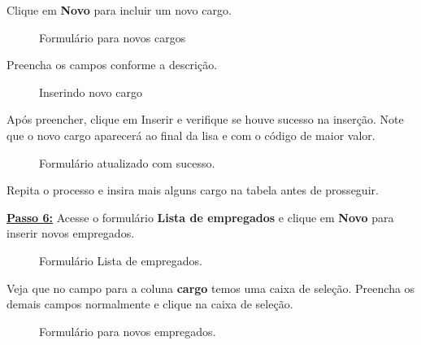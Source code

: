 \documentclass[9pt]{report}
\begin{document}
{       Clique em \textbf{Novo} para incluir um novo cargo.
       
       \begin{figure}[H]
        \caption{Formulário para novos cargos}
        \label{fig:novoscargos}
       \end{figure}

       Preencha os campos conforme a descrição.

       \begin{figure}[H]
        \caption{Inserindo novo cargo}
        \label{fig:novocargo}
       \end{figure}

       Após preencher, clique em Inserir e verifique se houve sucesso
       na inserção. Note que o novo cargo aparecerá ao final da lisa
       e com o código de maior valor.

       \begin{figure}[H]
        \caption{Formulário atualizado com sucesso.}
        \label{fig:cargoinserido}
       \end{figure}

       Repita o processo e insira mais alguns cargo na tabela antes
       de prosseguir.
      
       \underline{\textbf{Passo 6:}} Acesse o formulário
       \textbf{Lista de empregados} e clique em \textbf{Novo} para
       inserir novos empregados.

       \begin{figure}[H]
        \caption{Formulário Lista de empregados.}
        \label{fig:listaempregados}
       \end{figure}

       Veja que no campo para a coluna \textbf{cargo} temos uma caixa
       de seleção. Preencha os demais campos normalmente e clique na
       caixa de seleção.

       \begin{figure}[H]
        \caption{Formulário para novos empregados.}
        \label{fig:novosempregados}
       \end{figure}

}
\end{document}
